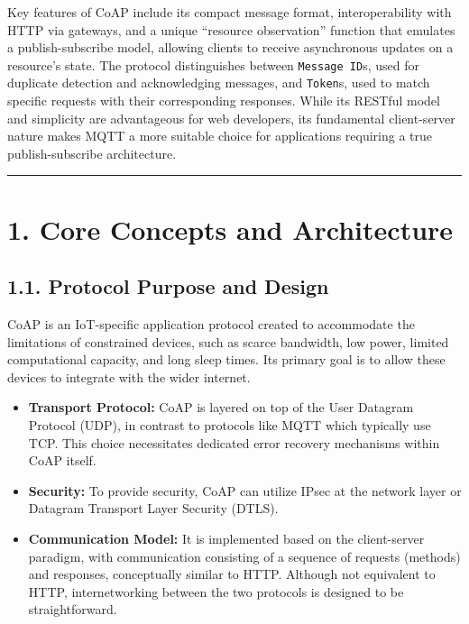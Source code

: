 \documentclass[a4paper, 12pt]{book} %
\begin{document}
Key features of CoAP include its compact message format,
interoperability with HTTP via gateways, and a unique ``resource
observation'' function that emulates a publish-subscribe model, allowing
clients to receive asynchronous updates on a resource's state. The
protocol distinguishes between \texttt{Message\ ID}s, used for duplicate
detection and acknowledging messages, and \texttt{Token}s, used to match
specific requests with their corresponding responses. While its RESTful
model and simplicity are advantageous for web developers, its
fundamental client-server nature makes MQTT a more suitable choice for
applications requiring a true publish-subscribe architecture.

\begin{center}\rule{0.5\linewidth}{0.5pt}\end{center}

\section{1. Core Concepts and
Architecture}\label{core-concepts-and-architecture}

\subsection{1.1. Protocol Purpose and
Design}\label{protocol-purpose-and-design}

CoAP is an IoT-specific application protocol created to accommodate the
limitations of constrained devices, such as scarce bandwidth, low power,
limited computational capacity, and long sleep times. Its primary goal
is to allow these devices to integrate with the wider internet.

\begin{itemize}
\tightlist
\item
  \textbf{Transport Protocol:} CoAP is layered on top of the User
  Datagram Protocol (UDP), in contrast to protocols like MQTT which
  typically use TCP. This choice necessitates dedicated error recovery
  mechanisms within CoAP itself.
\item
  \textbf{Security:} To provide security, CoAP can utilize IPsec at the
  network layer or Datagram Transport Layer Security (DTLS).
\item
  \textbf{Communication Model:} It is implemented based on the
  client-server paradigm, with communication consisting of a sequence of
  requests (methods) and responses, conceptually similar to HTTP.
  Although not equivalent to HTTP, internetworking between the two
  protocols is designed to be straightforward.
\end{itemize}
\end{document}
